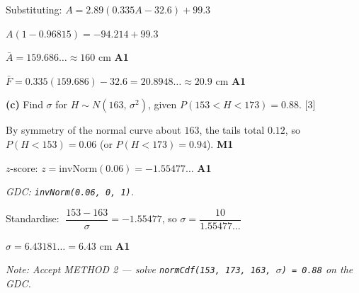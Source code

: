 \documentclass[12pt, twoside]{article}
\begin{document}
\begin{enumerate}[itemsep=0.3cm]
Substituting: $A = 2.89(0.335 A - 32.6) + 99.3$

$A(1 - 0.96815) = -94.214 + 99.3$

$\bar A = 159.686\ldots \approx 160$ cm \hfill \textbf{A1}

$\bar F = 0.335(159.686) - 32.6 = 20.8948\ldots \approx 20.9$ cm \hfill \textbf{A1}

\medskip

\textbf{(c)} Find $\sigma$ for $H \sim N(163,\, \sigma^{2})$, given $P(153 < H < 173) = 0.88$. \hfill [3]

\medskip

By symmetry of the normal curve about $163$, the tails total $0.12$,
so $P(H < 153) = 0.06$ (or $P(H < 173) = 0.94$). \hfill \textbf{M1}

$z$-score:\; $z = \text{invNorm}(0.06) = -1.55477\ldots$ \hfill \textbf{A1}

\textit{GDC: \texttt{invNorm(0.06, 0, 1)}.}

Standardise: $\;\dfrac{153 - 163}{\sigma} = -1.55477$, so $\sigma = \dfrac{10}{1.55477\ldots}$

$\sigma = 6.43181\ldots = 6.43$ cm \hfill \textbf{A1}

\textit{Note: Accept METHOD 2 — solve \texttt{normCdf(153, 173, 163, $\sigma$) = 0.88} on the GDC.}

\end{enumerate}
\end{document}
